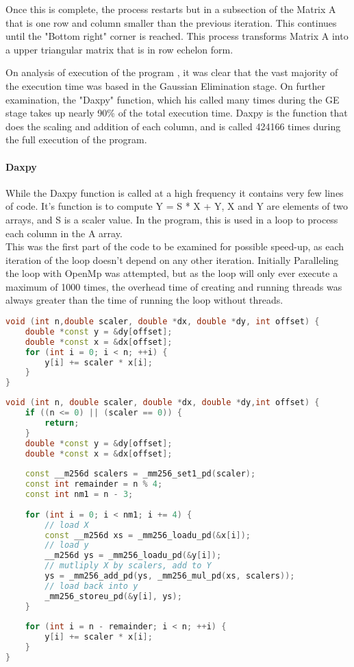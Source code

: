 \documentclass[conference]{acmsiggraph}
\begin{document}
Once this is complete, the process restarts but in a subsection of the Matrix A that is one row and column smaller than the previous iteration.
This continues until the "Bottom right" corner is reached. This process transforms Matrix A into a upper triangular matrix that is in row echelon form.

On analysis of execution of the program , it was clear that the vast majority of the execution time was based in the Gaussian Elimination stage.
On further examination, the "Daxpy" function, which his called many times during the GE stage takes up nearly 90\% of the total execution time.
Daxpy is the function that does the scaling and addition of each column, and is called 424166 times during the full execution of the program.

\paragraph{Daxpy}
While the Daxpy function is called at a high frequency it contains very few lines of code.
It's function is to compute Y = S * X + Y, X and Y are elements of two arrays, and S is a scaler value.
In the program, this is used in a loop to process each column in the A array.
\\
This was the first part of the code to be examined for possible speed-up, as each iteration of the loop doesn't depend on any other iteration.
Initially Paralleling the loop with OpenMp was attempted, but as the loop will only ever execute a maximum of 1000 times,
 the overhead time of creating and running threads was always greater than the time of running the loop without threads.

\begin{lstlisting}[language=C++,caption={daxpy Code},label=daxpyCode]
void (int n,double scaler, double *dx, double *dy, int offset) {
	double *const y = &dy[offset];
	double *const x = &dx[offset];
	for (int i = 0; i < n; ++i) {
		y[i] += scaler * x[i];
	}
}
\end{lstlisting}

\begin{lstlisting}[language=C++,caption={Simd daxpy Code},label=SimdDaxpyCode]
void (int n, double scaler, double *dx, double *dy,int offset) {
	if ((n <= 0) || (scaler == 0)) {
		return;
	}
	double *const y = &dy[offset];
	double *const x = &dx[offset];
	
	const __m256d scalers = _mm256_set1_pd(scaler);
	const int remainder = n % 4;
	const int nm1 = n - 3;
	
	for (int i = 0; i < nm1; i += 4) {
		// load X
		const __m256d xs = _mm256_loadu_pd(&x[i]);
		// load y
		__m256d ys = _mm256_loadu_pd(&y[i]);
		// mutliply X by scalers, add to Y
		ys = _mm256_add_pd(ys, _mm256_mul_pd(xs, scalers));
		// load back into y
		_mm256_storeu_pd(&y[i], ys);
	}
	
	for (int i = n - remainder; i < n; ++i) {
		y[i] += scaler * x[i];
	}
}
\end{lstlisting}
\end{document}
